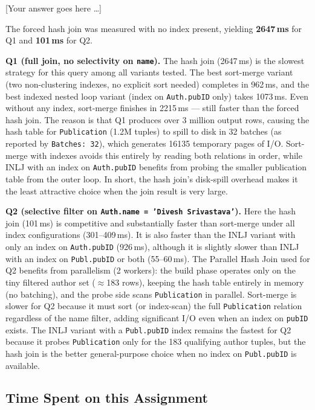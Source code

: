 \documentclass[11pt]{scrartcl}
\newcommand{\youranswerhere}{[Your answer goes here \ldots]}
\begin{document}
\youranswerhere{The forced hash join was measured with no index present, yielding \textbf{2647\,ms} for Q1 and \textbf{101\,ms} for Q2.

\textbf{Q1 (full join, no selectivity on \texttt{name}).}
The hash join (2647\,ms) is the slowest strategy for this query among all variants tested.
The best sort-merge variant (two non-clustering indexes, no explicit sort needed) completes in 962\,ms, and the best indexed nested loop variant (index on \texttt{Auth.pubID} only) takes 1073\,ms.
Even without any index, sort-merge finishes in 2215\,ms — still faster than the forced hash join.
The reason is that Q1 produces over 3 million output rows, causing the hash table for \texttt{Publication} (1.2M tuples) to spill to disk in 32 batches (as reported by \texttt{Batches: 32}), which generates 16135 temporary pages of I/O.
Sort-merge with indexes avoids this entirely by reading both relations in order, while INLJ with an index on \texttt{Auth.pubID} benefits from probing the smaller publication table from the outer loop.
In short, the hash join's disk-spill overhead makes it the least attractive choice when the join result is very large.

\textbf{Q2 (selective filter on \texttt{Auth.name = 'Divesh Srivastava'}).}
Here the hash join (101\,ms) is competitive and substantially faster than sort-merge under all index configurations (301--409\,ms).
It is also faster than the INLJ variant with only an index on \texttt{Auth.pubID} (926\,ms), although it is slightly slower than INLJ with an index on \texttt{Publ.pubID} or both (55--60\,ms).
The Parallel Hash Join used for Q2 benefits from parallelism (2 workers): the build phase operates only on the tiny filtered author set ($\approx$183 rows), keeping the hash table entirely in memory (no batching), and the probe side scans \texttt{Publication} in parallel.
Sort-merge is slower for Q2 because it must sort (or index-scan) the full \texttt{Publication} relation regardless of the name filter, adding significant I/O even when an index on \texttt{pubID} exists.
The INLJ variant with a \texttt{Publ.pubID} index remains the fastest for Q2 because it probes \texttt{Publication} only for the 183 qualifying author tuples, but the hash join is the better general-purpose choice when no index on \texttt{Publ.pubID} is available.}

\subsection*{Time Spent on this Assignment}
\end{document}
